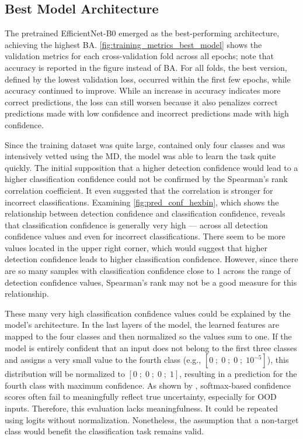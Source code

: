 \subsection{Best Model Architecture}
The pretrained EfficientNet-B0 emerged as the best-performing architecture, achieving the highest \ac{BA}.
\autoref{fig:training_metrics_best_model} shows the validation metrics for each cross-validation fold across all epochs; note that accuracy is reported in the figure instead of \ac{BA}.
For all folds, the best version, defined by the lowest validation loss, occurred within the first few epochs, while accuracy continued to improve.
While an increase in accuracy indicates more correct predictions, the loss can still worsen because it also penalizes correct predictions made with low confidence and incorrect predictions made with high confidence.

Since the training dataset was quite large, contained only four classes and was intensively vetted using the \ac{MD}, the model was able to learn the task quite quickly.
The initial supposition that a higher detection confidence would lead to a higher classification confidence could not be confirmed by the Spearman's rank correlation coefficient.
It even suggested that the correlation is stronger for incorrect classifications.
Examining \autoref{fig:pred_conf_hexbin}, which shows the relationship between detection confidence and classification confidence, reveals that classification confidence is generally very high — across all detection confidence values and even for incorrect classifications.
There seem to be more values located in the upper right corner, which would suggest that higher detection confidence leads to higher classification confidence.
However, since there are so many samples with classification confidence close to 1 across the range of detection confidence values, Spearman's rank may not be a good measure for this relationship.

These many very high classification confidence values could be explained by the model's architecture.
In the last layers of the model, the learned features are mapped to the four classes and then normalized so the values sum to one.
If the model is entirely confident that an input does not belong to the first three classes and assigns a very small value to the fourth class (e.g., \([0\;;\;0\;;\;0\;;\;10^{-5}]\)), this distribution will be normalized to \([0\;;\;0\;;\;0\;;\;1]\), resulting in a prediction for the fourth class with maximum confidence.
As shown by \textcite{hendrycksBaselineDetectingMisclassified2018}, softmax-based confidence scores often fail to meaningfully reflect true uncertainty, especially for \ac{OOD} inputs.
Therefore, this evaluation lacks meaningfulness.
It could be repeated using logits without normalization.
Nonetheless, the assumption that a non-target class would benefit the classification task remains valid.

